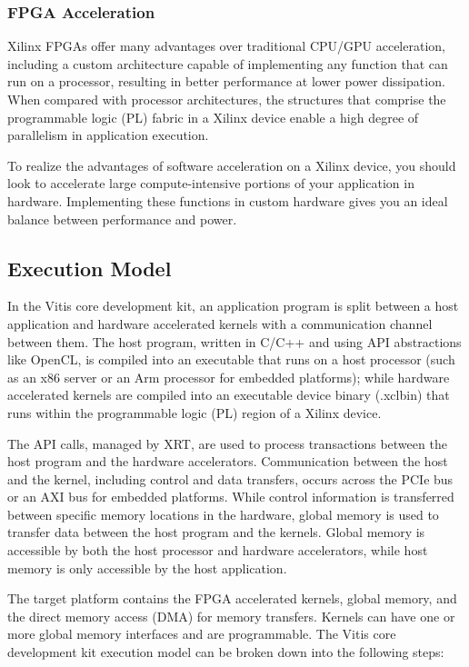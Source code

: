 \subsubsection{FPGA Acceleration}
Xilinx FPGAs offer many advantages over traditional CPU/GPU acceleration, including a custom architecture capable of implementing any function that can run on a processor, resulting in better performance at lower power dissipation. When compared with processor architectures, the structures that comprise the programmable logic (PL) fabric in a Xilinx device enable a high degree of parallelism in application execution.

\par To realize the advantages of software acceleration on a Xilinx device, you should look to accelerate large compute-intensive portions of your application in hardware. Implementing these functions in custom hardware gives you an ideal balance between performance and power.

\subsection{Execution Model} 
In the Vitis core development kit, an application program is split between a host application and hardware accelerated kernels with a communication channel between them. The host program, written in C/C++ and using API abstractions like OpenCL, is compiled into an executable that runs on a host processor (such as an x86 server or an Arm processor for embedded platforms); while hardware accelerated kernels are compiled into an executable device binary (.xclbin) that runs within the programmable logic (PL) region of a Xilinx device.


\par The API calls, managed by XRT, are used to process transactions between the host program and the hardware accelerators. Communication between the host and the kernel, including control and data transfers, occurs across the PCIe bus or an AXI bus for embedded platforms. While control information is transferred between specific memory locations in the hardware, global memory is used to transfer data between the host program and the kernels. Global memory is accessible by both the host processor and hardware accelerators, while host memory is only accessible by the host application.

\par The target platform contains the FPGA accelerated kernels, global memory, and the direct memory access (DMA) for memory transfers. Kernels can have one or more global memory interfaces and are programmable. The Vitis core development kit execution model can be broken down into the following steps:

